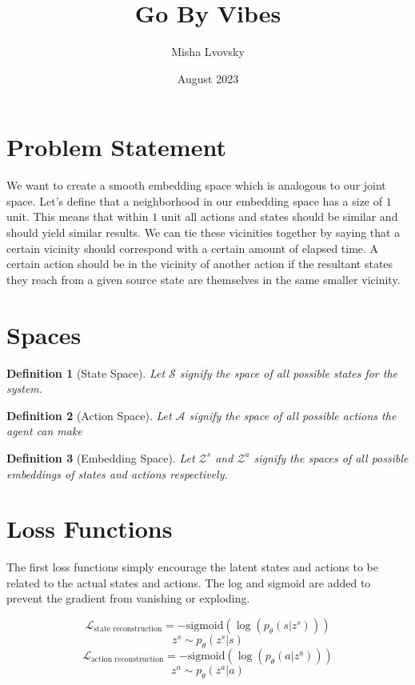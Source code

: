 \documentclass{article}
\title{Go By Vibes}
\author{Misha Lvovsky}
\date{August 2023}
\newtheorem{definition}{Definition}
\begin{document}
\maketitle

\section{Problem Statement}

We want to create a smooth embedding space which is analogous to our joint space.
Let's define that a neighborhood in our embedding space has a size of $1$ unit. This means that within $1$ unit all actions and states should be similar and should yield similar results. We can tie these vicinities together by saying that a certain vicinity should correspond with a certain amount of elapsed time. A certain action should be in the vicinity of another action if the resultant states they reach from a given source state are themselves in the same smaller vicinity.

\section{Spaces}

\begin{definition} [State Space] Let $\mathcal{S}$ signify the space of all possible states for the system.
\end{definition}
\begin{definition} [Action Space]
    Let $\mathcal{A}$ signify the space of all possible actions the agent can make
\end{definition}
\begin{definition} [Embedding Space]
Let $\mathcal{Z}^s$ and $\mathcal{Z}^a$ signify the spaces of all possible embeddings of states and actions respectively.
\end{definition}

\section{Loss Functions}

The first loss functions simply encourage the latent states and actions to be related to the actual states and actions.
The log and sigmoid are added to prevent the gradient from vanishing or exploding.

$$\mathcal{L}_\text{state reconstruction} = -\text{sigmoid}(\log(p_\theta(s|z^s)))$$
$$z^s \sim p_\theta(z^s | s)$$
$$\mathcal{L}_\text{action reconstruction} = -\text{sigmoid}(\log(p_\theta(a|z^a)))$$
$$z^a \sim p_\theta(z^a | a)$$
\end{document}
